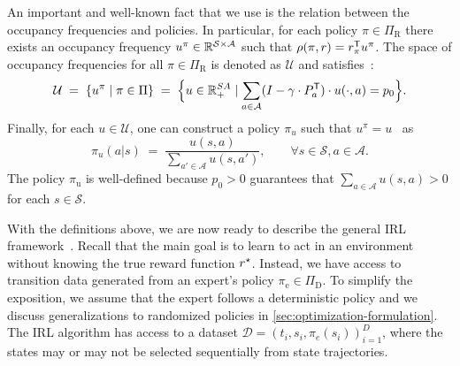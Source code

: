 \documentclass[10pt]{article}
\renewcommand{\cite}{\citep}
\theoremstyle{plain}
\theoremstyle{remark}
\begin{document}
An important and well-known fact that we use is the relation between the occupancy frequencies and policies. In particular, for each policy $\pi\in\Pi_{\mathrm{R}}$ there exists an occupancy frequency $u^{\pi}\in \mathbb{R}^{\mathcal{S}\times \mathcal{A}}$ such that $\rho(\pi, r) = r_{\pi}^{\mathsf{T}} u^{\pi}$. The space of occupancy frequencies for all $\pi\in \Pi_{\mathrm{R}}$
is denoted as $\mathcal{U}$ and satisfies~\cite[Section~6.9]{Puterman1994}:
\begin{equation} \label{eq:definition-u}
  \mathcal{U}
  \; =\; 
\left\{ u^{\pi} \mid  \pi \in \Pi \right\}
\; =\;
\Bigl\{ u\in \mathbb{R}^{SA}_{+} \mid \sum_{a\in \mathcal{A}} (I - \gamma\cdot P^{\mathsf{T}}_a) \cdot u(\cdot, a) = p_0 \Bigr\}.
\end{equation}
Finally, for each $u\in \mathcal{U}$, one can construct a policy $\pi_u$ such that $u^{\pi} = u$~\cite[Theorem~6.9.1]{Puterman1994} as
\begin{equation}\label{eq:policy-construction}
\pi_u(a|s) \; =\;  \frac{u(s,a)}{\sum_{a' \in \mathcal{A}} u(s,a')}, \qquad \forall s\in \mathcal{S}, a\in \mathcal{A}.
\end{equation}
The policy $\pi_{\mathrm{u}}$ is well-defined because $p_0 > 0$ guarantees that $\sum_{a\in \mathcal{A}} u(s,a) > 0$ for each $s\in \mathcal{S}$. 


With the definitions above, we are now ready to describe the general IRL framework~\cite{abbeel2004,Syed2008,Ho2016}. Recall that the main goal is to learn to act in an environment without knowing the true reward function $r^{\mathnormal{\star}}$. Instead, we have access to transition data generated from an expert's policy $\pi_{\mathrm{e}} \in \Pi_{\mathrm{D}}$. To simplify the exposition, we assume that the expert follows a deterministic policy and we discuss generalizations to randomized policies in \cref{sec:optimization-formulation}. The IRL algorithm has access to a dataset  \( \mathcal{D} = {(t_i, s_i, \pi_e(s_i))}_{i=1}^D \), where the states may or may not be selected sequentially from state trajectories.
\end{document}

